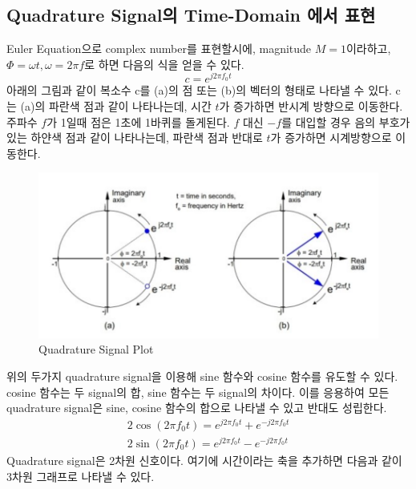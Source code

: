 \subsection{Quadrature Signal의 Time-Domain 에서 표현}
    Euler Equation으로 complex number를 표현할시에, magnitude $M = 1$이라하고, $\Phi = \omega t, \omega = 2 \pi f$로 하면 다음의 식을 얻을 수 있다. 
    \begin{equation*}
        c = e^{j2\pi f_0 t}
    \end{equation*}
    아래의 그림과 같이 복소수 c를 (a)의 점 또는 (b)의 벡터의 형태로 나타낼 수 있다. c는 (a)의 파란색 점과 같이 나타나는데, 시간 $t$가 증가하면 반시계 방향으로 이동한다. 주파수 $f$가 1일때 점은 1초에 1바퀴를 돌게된다. $f$ 대신 $-f$를 대입할 경우 음의 부호가 있는 하얀색 점과 같이 나타나는데, 파란색 점과 반대로 $t$가 증가하면 시계방향으로 이동한다.\\
\clearpage
    \vspace{-4mm}  
    \begin{figure}[!h]\centering
		\includegraphics[width=.7\textwidth]{image/week02/2-1-1.png}
		\caption{\small Quadrature Signal Plot}
		\vspace{-10pt}
    \end{figure}
    위의 두가지 quadrature signal을 이용해 sine 함수와 cosine 함수를 유도할 수 있다. cosine 함수는 두 signal의 합, sine 함수는 두 signal의 차이다. 이를 응용하여 모든 quadrature signal은 sine, cosine 함수의 합으로 나타낼 수 있고 반대도 성립한다.\\
    \vspace{-6mm}
    \begin{align*}
        2\cos(2\pi f_0t) = e^{j2\pi f_0 t} + e^{-j2\pi f_0 t}\\
        2\sin(2\pi f_0t) = e^{j2\pi f_0 t} - e^{-j2\pi f_0 t}
    \end{align*}
    Quadrature signal은 2차원 신호이다. 여기에 시간이라는 축을 추가하면 다음과 같이 3차원 그래프로 나타낼 수 있다.\\
    
